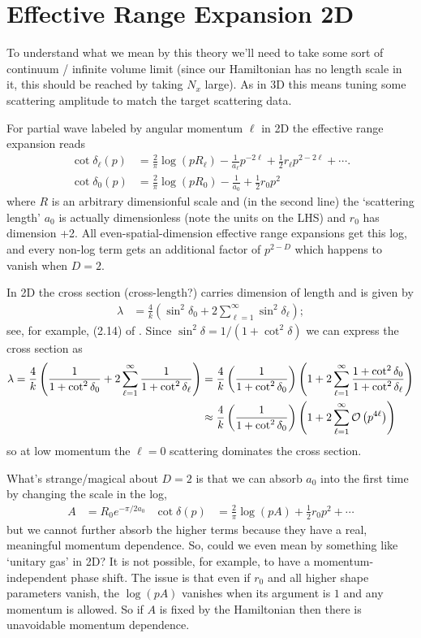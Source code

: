 \section{Effective Range Expansion 2D}

To understand what we mean by this theory we'll need to take some sort of continuum / infinite volume limit (since our Hamiltonian has no length scale in it, this should be reached by taking $N_x$ large).
As in 3D this means tuning some scattering amplitude to match the target scattering data.

For partial wave labeled by angular momentum $\ell$ in 2D the effective range expansion reads
\begin{align}
	\cot \delta_\ell(p)
	&=
			\frac{2}{\pi} \log(p R_\ell)
		-	\frac{1}{a_\ell} p^{-2\ell}
		+	\frac{1}{2} r_\ell p^{2-2\ell}
		+	\cdots.
	\\
	\cot \delta_0(p)
	&=
			\frac{2}{\pi} \log(p R_0)
		-	\frac{1}{a_0}
		+	\frac{1}{2} r_0 p^2
\end{align}
where $R$ is an arbitrary dimensionful scale and (in the second line) the `scattering length' $a_0$ is actually dimensionless (note the units on the LHS) and $r_0$ has dimension +2.
All even-spatial-dimension effective range expansions get this log, and every non-log term gets an additional factor of $p^{2-D}$ which happens to vanish when $D=2$.

In 2D the cross section (cross-length?) carries dimension of length and is given by
\begin{align}
	\lambda &= \frac{4}{k}\left(\sin^2 \delta_0 + 2\sum_{\ell=1}^{\infty} \sin^2 \delta_\ell \right);
\end{align}
see, for example, (2.14) of .
Since $\sin^2 \delta = 1/(1+\cot^2\delta)$ we can express the cross section as
\begin{align}
	\lambda
	=
	\frac{4}{k}\left(\frac{1}{1+\cot^2 \delta_0} + 2\sum_{\ell=1}^{\infty} \frac{1}{1+\cot^2 \delta_\ell} \right)
	&=
	\frac{4}{k}\left(\frac{1}{1+\cot^2 \delta_0}\right) \left(1+ 2\sum_{\ell=1}^{\infty} \frac{1+\cot^2 \delta_0}{1+\cot^2 \delta_\ell} \right)
	\\
	&\approx
	\frac{4}{k}\left(\frac{1}{1+\cot^2 \delta_0}\right) \left(1+ 2\sum_{\ell=1}^{\infty} \mathcal{O}\left(p^{4\ell}\right) \right)
\end{align}
so at low momentum the $\ell=0$ scattering dominates the cross section.

What's strange/magical about $D=2$ is that we can absorb $a_0$ into the first time by changing the scale in the log,
\begin{align}
	A &= R_0 e^{-\pi/2a_0}
	&
	\cot \delta(p)
	&=
			\frac{2}{\pi} \log(p A)
		+	\frac{1}{2} r_0 p^2
		+	\cdots
	\label{eq:no-constant}
\end{align}
but we cannot further absorb the higher terms because they have a real, meaningful momentum dependence.
So, could we even mean by something like `unitary gas' in 2D?
It is not possible, for example, to have a momentum-independent phase shift.
The issue is that even if $r_0$ and all higher shape parameters vanish, the $\log(pA)$ vanishes when its argument is $1$ and any momentum is allowed.
So if $A$ is fixed by the Hamiltonian then there is unavoidable momentum dependence.

